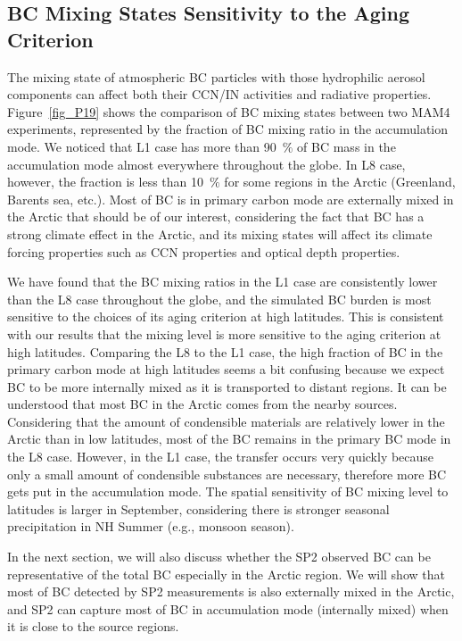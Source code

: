 \documentclass[12pt, fullpage]{uiucthesis2009_2}
\begin{document}
	\subsection{BC Mixing States Sensitivity to the Aging Criterion} 
	The mixing state of atmospheric BC particles with those hydrophilic aerosol components can affect both their CCN/IN activities and radiative properties. Figure~\ref{fig_P19} shows the comparison of BC mixing states between two MAM4 experiments, represented by the fraction of BC mixing ratio in the accumulation mode. We noticed that L1 case has more than 90~$\%$ of BC mass in the accumulation mode almost everywhere throughout the globe. In L8 case, however, the fraction is less than 10~$\%$ for some regions in the Arctic (Greenland, Barents sea, etc.). Most of BC is in primary carbon mode are externally mixed in the Arctic that should be of our interest, considering the fact that BC has a strong climate effect in the Arctic, and its mixing states will affect its climate forcing properties such as CCN properties and optical depth properties.  
	
	We have found that the BC mixing ratios in the L1 case are consistently lower than the L8 case throughout the globe, and the simulated BC burden is most sensitive to the choices of its aging criterion at high latitudes. This is consistent with our results that the mixing level is more sensitive to the aging criterion at high latitudes. Comparing the L8 to the L1 case, the high fraction of BC in the primary carbon mode at high latitudes seems a bit confusing because we expect BC to be more internally mixed as it is transported to distant regions. It can be understood that most BC in the Arctic comes from the nearby sources. Considering that the amount of condensible materials are relatively lower in the Arctic than in low latitudes, most of the BC remains in the primary BC mode in the L8 case. However, in the L1 case, the transfer occurs very quickly because only a small amount of condensible substances are necessary, therefore more BC gets put in the accumulation mode. The spatial sensitivity of BC mixing level to latitudes is larger in September, considering there is stronger seasonal precipitation in NH Summer (e.g., monsoon season). 
	
	In the next section, we will also discuss whether the SP2 observed BC can be representative of the total BC especially in the Arctic region. We will show that most of BC detected by SP2 measurements is also externally mixed in the Arctic, and SP2 can capture most of BC in accumulation mode (internally mixed) when it is close to the source regions.
	
\end{document}

